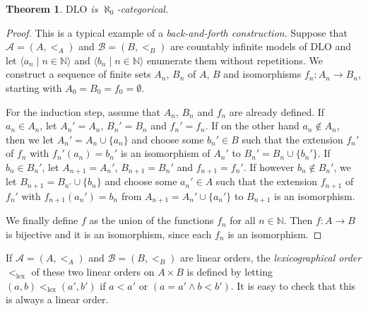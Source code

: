 \documentclass[10pt]{amsart}
\newcommand{\NNN}{\mathbb{N}}
\renewcommand{\AA}{\mathcal{A}}
\newcommand{\BB}{\mathcal{B}}
\newcommand{\DLO}{\mathrm{DLO}}
\newcommand{\lex}{\mathrm{lex}}
\newtheorem{theorem}{Theorem}[subsection]
\theoremstyle{definition}
\theoremstyle{remark}
\begin{document}
\begin{theorem} \label{DLO is aleph0-categorical} 
$\DLO$ is $\aleph_0$-categorical. 
\end{theorem} 
\begin{proof} 
This is a typical example of a \emph{back-and-forth construction}. Suppose that $\AA=(A,<_A)$ and $\BB=(B,<_B)$ are countably infinite models of $\DLO$ and let $\langle a_n\mid n\in\NNN\rangle$ and $\langle b_n\mid n\in\NNN\rangle$ enumerate them without repetitions. We construct a sequence of finite sets $A_n$, $B_n$ of $A$, $B$ and isomorphisms $f_n\colon A_n\rightarrow B_n$, starting with $A_0=B_0=f_0=\emptyset$. 

For the induction step, assume that $A_n$, $B_n$ and $f_n$ are already defined. If $a_n\in A_n$, let $A_n'=A_n$, $B_n'=B_n$ and  $f_n'=f_n$. If on the other hand $a_n\notin A_n$, then we let $A_n'=A_n\cup\{a_n\}$ and choose some $b_n'\in B$ such that the extension $f_n'$ of $f_n$ with $f_n'(a_n)=b_n'$ is an isomorphism of $A_n'$ to $B_n'=B_n\cup\{b_n'\}$. If $b_n\in B_n'$, let $A_{n+1}=A_n'$, $B_{n+1}=B_n'$ and  $f_{n+1}=f_n'$. If however $b_n\notin B_n'$, we let $B_{n+1}=B_{n'}\cup\{b_n\}$ and choose some $a_n'\in A$ such that the extension $f_{n+1}$ of $f_n'$ with $f_{n+1}(a_n')=b_n$ from $A_{n+1}=A_n'\cup\{a_n'\}$ to $B_{n+1}$ is an isomorphism. 

We finally define $f$ as the union of the functions $f_n$ for all $n\in\NNN$. Then $f\colon A\rightarrow B$ is bijective and it is an isomorphism, since each $f_n$ is an isomorphism. 
\end{proof} 

If $\AA=(A,<_A)$ and $\BB=(B,<_B)$ are linear orders, the \emph{lexicographical order} $<_\lex$ of these two linear orders on $A\times B$ is defined by letting $(a,b)<_\lex(a',b')$ if $a<a'$ or $(a=a' \wedge b<b')$. It is easy to check that this is always a linear order. 
\end{document}
